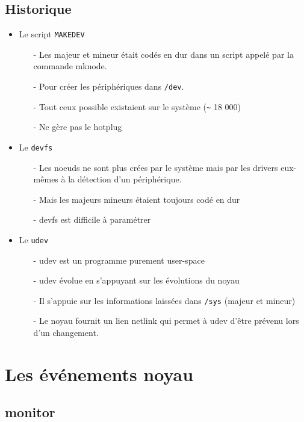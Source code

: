\documentclass[compress,aspectratio=169]{beamer}
\begin{document}
\subsection{Historique}
\begin{frame}{}
\begin{itemize}
\item Le script \texttt{MAKEDEV}
\begin{itemize}
	\item[-] Les majeur et mineur était codés en dur dans un script appelé par la commande mknode.
	\item[-] Pour créer les périphériques dans \texttt{/dev}.
	\item[-] Tout ceux possible existaient sur le système (\texttt{\~} 18 000)
	\item[-] Ne gère pas le hotplug
\end{itemize}
\item Le \texttt{devfs}
\begin{itemize}
	\item[-] Les noeuds ne sont plus crées par le système mais par les drivers eux-mêmes à la détection d'un périphérique.
	\item[-] Mais les majeurs mineurs étaient toujours codé en dur
	\item[-] devfs est difficile à paramétrer
\end{itemize}
\item Le \texttt{udev}
\begin{itemize}
	\item[-] udev est un programme purement user-space
	\item[-] udev évolue en s'appuyant sur les évolutions du noyau
	\item[-] Il s’appuie sur les informations laissées dans \texttt{/sys} (majeur et mineur)
	\item[-] Le noyau fournit un lien netlink qui permet à udev d'être prévenu lors d'un changement.
\end{itemize}
\end{itemize}
\end{frame}



\section{Les événements noyau}

\subsection{monitor}
\end{document}
